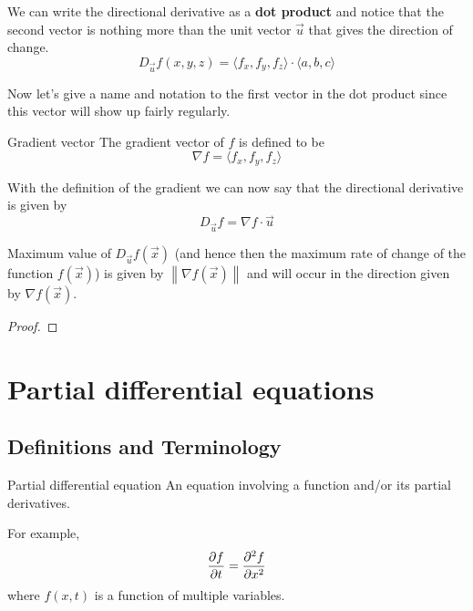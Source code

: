 We can write the directional derivative as a \textbf{dot product} and notice that the second vector is nothing more than the unit vector $\vec u$ that gives the direction of change.
\begin{equation}
{D_{\vec u}} f(x,y,z) = \langle {f_x,f_y,f_z} \rangle \cdot \langle {a,b,c} \rangle
\end{equation}

Now let's give a name and notation to the first vector in the dot product since this vector will show up fairly regularly.
\begin{defn}{Gradient vector}
The gradient vector of $f$ is defined to be
\begin{equation}
\nabla f = \langle f_x,f_y,f_z \rangle
\end{equation}
\end{defn}

With the definition of the gradient we can now say that the directional derivative is given by
\[ {D_{\vec u}}f = \nabla f\cdot \vec u \]

\begin{thrm}{}{}
Maximum value of $D_{\vec u} f(\vec{x})$ (and hence then the maximum rate of change of the function $f(\vec{x})$) is given by $\left\|\nabla f(\vec{x})\right\|$ and will occur in the direction given by $\nabla f(\vec{x})$.
\end{thrm}

\begin{proof}

\end{proof}
\pagebreak

\section{Partial differential equations}
\subsection{Definitions and Terminology}
\begin{defn}{Partial differential equation}{}
An equation involving a function and/or its partial derivatives. 
\end{defn}

For example, \[ \pdv{f}{t}=\pdv[order={2}]{f}{x} \]
where $f(x,t)$ is a function of multiple variables.

